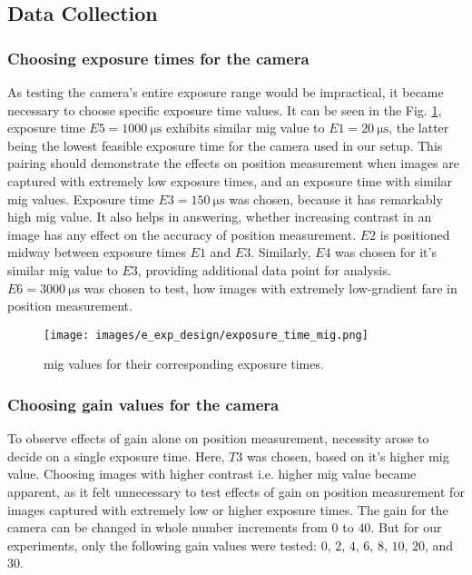 \subsection{Data Collection}\label{section:data_collection}
\subsubsection*{Choosing exposure times for the camera}
As testing the camera's entire exposure range would be impractical, it became necessary to choose specific exposure time values. It can be seen in the Fig. \ref{fig:exposure_time_mig.png}, exposure time $E5=\SI{1000}{\micro\second}$ exhibits similar \gls{mig} value to $E1=\SI{20}{\micro\second}$, the latter being the lowest feasible exposure time for the camera used in our setup. This pairing should demonstrate the effects on position measurement when images are captured with extremely low exposure times, and an exposure time with similar \gls{mig} values. Exposure time $E3=\SI{150}{\micro\second}$ was chosen, because it has remarkably high \gls{mig} value. It also helps in answering, whether increasing contrast in an image has any effect on the accuracy of position measurement. $E2$ is positioned midway between exposure times $E1$ and $E3$. Similarly, $E4$ was chosen for it's similar \gls{mig} value to $E3$, providing additional data point for analysis. $E6=\SI{3000}{\micro\second}$ was chosen to test, how images with extremely low-gradient fare in position measurement.

\begin{figure}[h]
    \centering
    \texttt{[image: images/e\_exp\_design/exposure\_time\_mig.png]}
    \caption{\gls{mig} values for their corresponding exposure times.}
    \label{fig:exposure_time_mig.png}
\end{figure}

\subsubsection*{Choosing gain values for the camera}
To observe effects of gain alone on position measurement, necessity arose to decide on a single exposure time. Here, $T3$ was chosen, based on it's higher \gls{mig} value. Choosing images with higher contrast i.e. higher \gls{mig} value became apparent, as it felt unnecessary to test effects of gain on position measurement for images captured with extremely low or higher exposure times. The gain for the camera can be changed in whole number increments from $0$ to $40$. But for our experiments, only the following gain values were tested: $0$, $2$, $4$, $6$, $8$, $10$, $20$, and $30$. 

